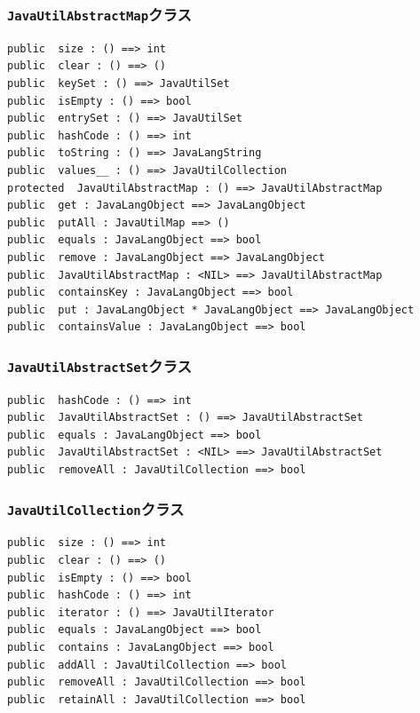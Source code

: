 \documentclass[\pformat,12pt]{jarticle}
\begin{document}
\subsubsection{\texttt{JavaUtilAbstractMap}クラス}
\begin{small}
\begin{verbatim}
public  size : () ==> int
public  clear : () ==> ()
public  keySet : () ==> JavaUtilSet
public  isEmpty : () ==> bool
public  entrySet : () ==> JavaUtilSet
public  hashCode : () ==> int
public  toString : () ==> JavaLangString
public  values__ : () ==> JavaUtilCollection
protected  JavaUtilAbstractMap : () ==> JavaUtilAbstractMap
public  get : JavaLangObject ==> JavaLangObject
public  putAll : JavaUtilMap ==> ()
public  equals : JavaLangObject ==> bool
public  remove : JavaLangObject ==> JavaLangObject
public  JavaUtilAbstractMap : <NIL> ==> JavaUtilAbstractMap
public  containsKey : JavaLangObject ==> bool
public  put : JavaLangObject * JavaLangObject ==> JavaLangObject
public  containsValue : JavaLangObject ==> bool
\end{verbatim}
\end{small}

\subsubsection{\texttt{JavaUtilAbstractSet}クラス}
\begin{small}
\begin{verbatim}
public  hashCode : () ==> int
public  JavaUtilAbstractSet : () ==> JavaUtilAbstractSet
public  equals : JavaLangObject ==> bool
public  JavaUtilAbstractSet : <NIL> ==> JavaUtilAbstractSet
public  removeAll : JavaUtilCollection ==> bool
\end{verbatim}
\end{small}

\subsubsection{\texttt{JavaUtilCollection}クラス}
\begin{small}
\begin{verbatim}
public  size : () ==> int
public  clear : () ==> ()
public  isEmpty : () ==> bool
public  hashCode : () ==> int
public  iterator : () ==> JavaUtilIterator
public  equals : JavaLangObject ==> bool
public  contains : JavaLangObject ==> bool
public  addAll : JavaUtilCollection ==> bool
public  removeAll : JavaUtilCollection ==> bool
public  retainAll : JavaUtilCollection ==> bool
\end{verbatim}
\end{small}
\end{document}
